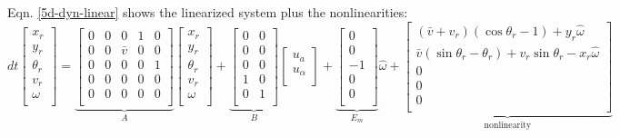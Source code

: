 \documentclass{article}
\begin{document}
Eqn. \ref{5d-dyn-linear} shows the linearized system plus the nonlinearities: 
\begin{equation}
\label{5d-dyn-linear}
dt\begin{bmatrix}
x_r \\
y_r \\
\theta_r \\
v_r \\
\omega\\
\end{bmatrix} = 
\underbrace{\begin{bmatrix}
0 & 0 & 0 & 1 & 0\\
0 & 0 & \bar{v} & 0 & 0\\
0 & 0 & 0 & 0 & 1\\
0 & 0 & 0 & 0 & 0\\
0 & 0 & 0 & 0 & 0\\
\end{bmatrix}}_{A}
\begin{bmatrix}
x_r \\
y_r \\
\theta_r \\
v_r \\
\omega\\
\end{bmatrix} + 
\underbrace{\begin{bmatrix}
0 & 0 \\
0 & 0\\
0 & 0 \\
1 & 0 \\
0 & 1\\
\end{bmatrix}}_{B}
\begin{bmatrix}
u_a \\
u_\alpha\\
\end{bmatrix} +
\underbrace{\begin{bmatrix}
0\\
0\\
-1 \\
0\\
0\\
\end{bmatrix} }_{E_m} \hat{\omega}+
\underbrace{\begin{bmatrix}
(\bar{v} + v_r) (\cos\theta_r -1)+ y_r \hat{\omega} \\
 \bar{v}( \sin\theta_r - \theta_r) + v_r\sin\theta_r - x_r \hat{\omega}\\
0\\
0 \\
0\\
\end{bmatrix}}_{\text{nonlinearity}}
\end{equation}
\end{document}
